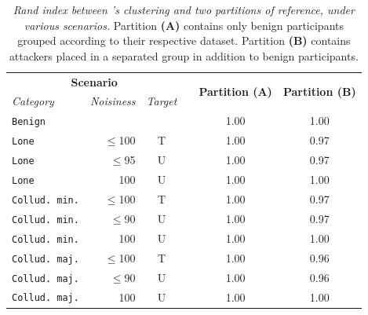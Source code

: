 \begin{table}
  \centering
  \caption{
    \emph{Rand index between \thecontrib's clustering and two partitions of reference, under various scenarios.} 
    Partition \textbf{(A)} contains only benign participants grouped according to their respective dataset. 
    Partition \textbf{(B)} contains attackers placed in a separated group in addition to benign participants. 
    \label{tbl:radar.rand_clustering}
  }

  \setlength\tabcolsep{0.8ex}
  \begin{tabular}{lrcccc}
    \toprule
    \multicolumn{3}{c}{\textbf{Scenario}} && \multirow{2}{*}{\textbf{Partition (A)}} & \multirow{2}{*}{\textbf{Partition (B)}} \\
    \textit{Category} & \textit{Noisiness} & \textit{Target} && & \\
    \midrule %
    \texttt{Benign} & & && 1.00 & 1.00 \\ 
    
    \midrule[.1pt] %
    \texttt{Lone } & $\le$100 & T && 1.00 & 0.97 \\
    \texttt{Lone} & $\le$95 & U && 1.00 & 0.97 \\
    \texttt{Lone} & 100 & U  && 1.00 & 1.00 \\  
    
    \midrule[.1pt] %
    \texttt{Collud. min.} & $\le$100 & T && 1.00 & 0.97 \\
    \texttt{Collud. min.} & $\le$90 & U && 1.00 & 0.97 \\
    \texttt{Collud. min.} & 100 & U && 1.00 & 1.00 \\

    \midrule[.005em] %
    \texttt{Collud. maj.} & $\le$100 & T && 1.00 & 0.96 \\
    \texttt{Collud. maj.} & $\le$90 & U && 1.00 & 0.96 \\
    \texttt{Collud. maj.} & 100 & U && 1.00  & 1.00 \\
    \bottomrule %
  \end{tabular}
\end{table}

